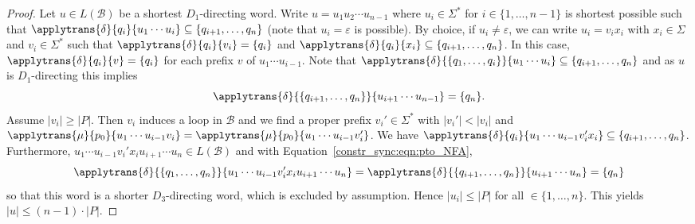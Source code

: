 \begin{proof}

 Let $u \in L(\mathcal B)$ be a shortest $D_1$-directing word. 
 Write $u = u_1 u_2 \cdots u_{n-1}$
 where $u_i \in \Sigma^*$ for $i \in \{1,\ldots,n-1\}$
 is shortest possible
 such that $\applytrans{\delta}{q_i}{u_1 \cdots u_i} \subseteq \{q_{i+1}, \ldots, q_n\}$
 (note that $u_i = \varepsilon$ is possible).
 By choice, if $u_i\ne \varepsilon$,
 we can write $u_i = v_i x_i$ with $x_i \in \Sigma$ and $v_i \in \Sigma^*$
 such that $\applytrans{\delta}{q_i}{v_i} = \{q_i\}$ 
 and $\applytrans{\delta}{q_i}{x_i} \subseteq \{q_{i+1}, \ldots, q_n\}$.
 In this case, $\applytrans{\delta}{q_i}{v} = \{q_i\}$ 
 for each prefix $v$ of $u_1 \cdots u_{i-1}$.
 Note that $\applytrans{\delta}{\{q_1, \ldots, q_i\}}{u_1 \cdots u_i}
 \subseteq \{q_{i+1}, \ldots, q_n\}$ and as $u$
 is $D_1$-directing this implies 
 \begin{equation}
 \label{constr_sync:eqn:pto_NFA}
     \applytrans{\delta}{\{q_{i+1}, \ldots, q_n\}}{u_{i+1} \cdots u_{n-1}}
      = \{q_n\}.
 \end{equation}
 Assume $|v_i| \ge |P|$. Then $v_i$ induces a loop in $\mathcal B$
 and we find a proper prefix $v_i' \in \Sigma^*$ with $|v_i'| < |v_i|$ 
 and 
 $\applytrans{\mu}{p_0}{u_1 \cdots u_{i-1} v_i} = \applytrans{\mu}{p_0}{u_1 \cdots u_{i-1} v_i'}$.
 We have $\applytrans{\delta}{q_i}{u_1 \cdots u_{i-1} v_i'x_i}
 \subseteq \{ q_{i+1}, \ldots, q_n \}$.
 Furthermore,
 $u_1 \cdots u_{i-1} v_i' x_i u_{i+1} \cdots u_n \in L(\mathcal B)$
 and with Equation~\eqref{constr_sync:eqn:pto_NFA},
 \[
 \applytrans{\delta}{\{q_1, \ldots, q_n\}}{u_1 \cdots u_{i-1} v_i' x_i u_{i+1} \cdots u_n}
  = \applytrans{\delta}{\{q_{i+1},\ldots,q_n\}}{ u_{i+1} \cdots u_n }
  = \{q_n\}
 \]
 so that this word is a shorter $D_3$-directing
 word, which is excluded by assumption.
 Hence $|u_i| \le |P|$ for all $ \in \{1,\ldots,n\}$.
 This yields $|u| \le (n-1)\cdot |P|$.
\end{proof}



